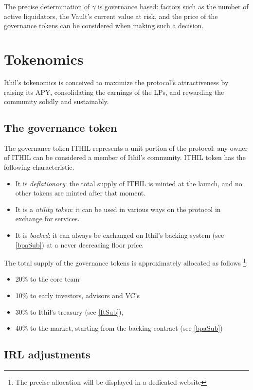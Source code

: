 \documentclass[a4paper,10 pt]{article}
\theoremstyle{definition}
\begin{document}
The precise determination of $\gamma$ is governance based: factors such as the number of active liquidators, the Vault's current value at risk, and the price of the governance tokens can be considered when making such a decision.

\section{Tokenomics}\label{tokSec}
Ithil's tokenomics is conceived to maximize the protocol's attractiveness by raising its APY, consolidating the earnings of the LPs, and rewarding the community solidly and sustainably.

\subsection{The governance token}\label{govSub}
The governance token ITHIL represents a unit portion of the protocol: any owner of ITHIL can be considered a member of Ithil's community. ITHIL token has the following characteristic.
\begin{itemize}
\item It is {\it deflationary}: the total supply of ITHIL is minted at the launch, and no other tokens are minted after that moment.
\item It is a {\it utility token}: it can be used in various ways on the protocol in exchange for services.
\item It is {\it backed}: it can always be exchanged on Ithil's backing system (see \ref{bpaSub}) at a never decreasing floor price.
\end{itemize}

The total supply of the governance tokens is approximately allocated as follows  \footnote{The precise allocation will be displayed in a dedicated website}:
\begin{itemize}
\item 20\% to the core team
\item 10\% to early investors, advisors and VC's
\item 30\% to Ithil's treasury (see \ref{ItSub}), 
\item 40\% to the market, starting from the backing contract (see \ref{bpaSub})
\end{itemize}

\subsection{IRL adjustments}\label{irladjSub}
\end{document}
